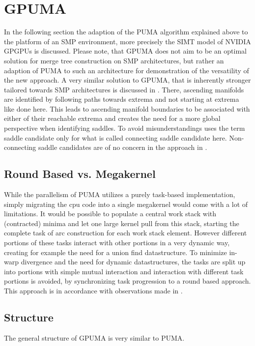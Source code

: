 \documentclass[%
	paper=A4,					%
	twoside=true,				%
	openright,					%
	parskip=full,				%
	chapterprefix=true,			%
	11pt,						%
	headings=normal,			%
	bibliography=totoc,			%
	listof=totoc,				%
	titlepage=on,				%
	captions=tableabove,		%
	draft=false,				%
]{scrreprt}%
\begin{document}
\chapter{GPUMA}
In the following section the adaption of the PUMA algorithm explained above to the platform of an SMP environment, more precisely the SIMT model of NVIDIA GPGPUs is discussed. Please note, that GPUMA does not aim to be an optimal solution for merge tree construction on SMP architectures, but rather an adaption of PUMA to such an architecture for demonstration of the versatility of the new approach. A very similar solution to GPUMA, that is inherently stronger tailored towards SMP architectures is discussed in \cite{Carr}. There, ascending manifolds are identified by following paths towards extrema and not starting at extrema like done here. This leads to ascending manifold boundaries to be associated with either of their reachable extrema and creates the need for a more global perspective when identifying saddles. To avoid misunderstandings \cite{Carr} uses the term saddle candidate only for what is called connecting saddle candidate here. Non-connecting saddle candidates are of no concern in the approach in \cite{Carr}.

\section{Round Based vs. Megakernel}
While the parallelism of PUMA utilizes a purely task-based implementation, simply migrating the cpu code into a single megakernel would come with a lot of limitations. It would be possible to populate a central work stack with (contracted) minima and let one large kernel pull from this stack, starting the complete task of arc construction for each work stack element. However different portions of these tasks interact with other portions in a very dynamic way, creating for example the need for a union find datastructure. To minimize in-warp divergence and the need for dynamic datastructures, the tasks are split up into portions with simple mutual interaction and interaction with different task portions is avoided, by synchronizing task progression to a round based approach. This approach is in accordance with observations made in \cite{megakernel}.

\section{Structure}
The general structure of GPUMA is very similar to PUMA. 
\end{document}
